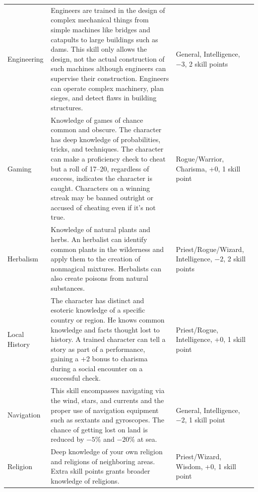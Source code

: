 \begin{minipage}{\columnwidth}
\begin{tabular}{|p{}|p{}|p{}|}
Engineering	& Engineers are trained in the design of complex mechanical things from simple machines like bridges and catapults to large buildings such as dams.  This skill only allows the design, not the actual construction of such machines although engineers can supervise their construction.  Engineers can operate complex machinery, plan sieges, and detect flaws in building structures.	& General, Intelligence, $-3$, 2 skill points \\
\rowcolor[gray]{.9}Gaming	& Knowledge of games of chance common and obscure.  The character has deep knowledge of probabilities, tricks, and techniques.  The character can make a proficiency check to cheat but a roll of 17--20, regardless of success, indicates the character is caught.  Characters on a winning streak may be banned outright or accused of cheating even if it's not true.	& Rogue/Warrior, Charisma, +0, 1 skill point \\
Herbalism	& Knowledge of natural plants and herbs.  An herbalist can identify common plants in the wilderness and apply them to the creation of nonmagical mixtures.  Herbalists can also create poisons from natural substances.	& Priest/Rogue/Wizard, Intelligence, $-2$, 2 skill points \\
\rowcolor[gray]{.9}Local History	& The character has distinct and esoteric knowledge of a specific country or region.  He knows common knowledge and facts thought lost to history.  A trained character can tell a story as part of a performance, gaining a +2 bonus to charisma during a social encounter on a successful check.	& Priest/Rogue, Intelligence, +0, 1 skill point \\
Navigation	& This skill encompasses navigating via the wind, stars, and currents and the proper use of navigation equipment such as sextants and gyroscopes.  The chance of getting lost on land is reduced by $-5$\% and $-20$\% at sea.	& General, Intelligence, $-2$, 1 skill point \\
\rowcolor[gray]{.9}Religion	& Deep knowledge of your own religion and religions of neighboring areas.  Extra skill points grants broader knowledge of religions.	& Priest/Wizard, Wisdom, +0, 1 skill point \\
\hline
\end{tabular}

\end{minipage}

